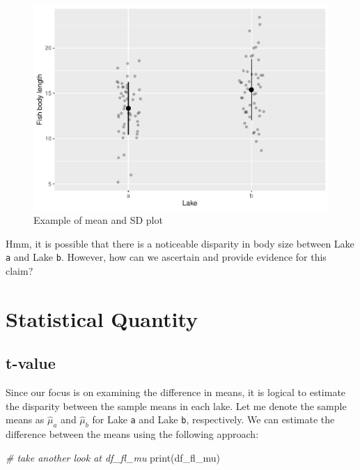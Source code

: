 \documentclass[
]{book}
\newenvironment{Shaded}{\begin{snugshade}}{\end{snugshade}}
\newcommand{\CommentTok}[1]{\textcolor[rgb]{0.56,0.35,0.01}{\textit{#1}}}
\newcommand{\FunctionTok}[1]{\textcolor[rgb]{0.00,0.00,0.00}{#1}}
\newcommand{\NormalTok}[1]{#1}
\begin{document}
\begin{figure}

{\centering \includegraphics{_main_files/figure-latex/mean-plot-1} 

}

\caption{Example of mean and SD plot}\label{fig:mean-plot}
\end{figure}

Hmm, it is possible that there is a noticeable disparity in body size between Lake \texttt{a} and Lake \texttt{b}. However, how can we ascertain and provide evidence for this claim?

\hypertarget{statistical-quantity}{%
\section{Statistical Quantity}\label{statistical-quantity}}

\hypertarget{t-value}{%
\subsection{t-value}\label{t-value}}

Since our focus is on examining the difference in means, it is logical to estimate the disparity between the sample means in each lake. Let me denote the sample means as \(\hat{\mu}_a\) and \(\hat{\mu}_b\) for Lake \texttt{a} and Lake \texttt{b}, respectively. We can estimate the difference between the means using the following approach:

\begin{Shaded}
\begin{Highlighting}[]
\CommentTok{\# take another look at df\_fl\_mu}
\FunctionTok{print}\NormalTok{(df\_fl\_mu)}
\end{Highlighting}
\end{Shaded}
\end{document}
